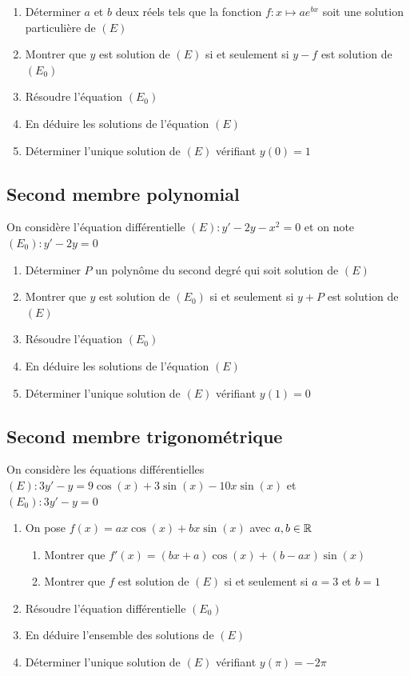 \documentclass[oneside,12pt]{book}          %
\begin{document}
\begin{enumerate}
    \item Déterminer $a$ et $b$ deux réels tels que la fonction $f:x\mapsto ae^{bx}$ soit une solution particulière de $(E)$
    \item Montrer que $y$ est solution de $(E)$ si et seulement si $y-f$ est solution de $(E_0)$
    \item Résoudre l'équation $(E_0)$
    \item En déduire les solutions de l'équation $(E)$
    \item Déterminer l'unique solution de $(E)$ vérifiant $y(0)=1$
\end{enumerate}



\subsection{Second membre polynomial}
  On considère l'équation différentielle $(E):y'-2y-x^2=0$ et on note $(E_0):y'-2y=0$

\begin{enumerate}
    \item Déterminer $P$ un polynôme du second degré qui soit solution de $(E)$
    \item Montrer que $y$ est solution de $(E_0)$ si et seulement si $y+P$ est solution de $(E)$
    \item Résoudre l'équation $(E_0)$
    \item En déduire les solutions de l'équation $(E)$
    \item Déterminer l'unique solution de $(E)$ vérifiant $y(1)=0$
\end{enumerate}



\subsection{Second membre trigonométrique}
On considère les équations différentielles $(E):3y'-y=9\cos(x)+3\sin(x)-10x\sin(x)$ et\\
$(E_0):3y'-y=0$
\begin{enumerate}
    \item On pose $f(x)=ax\cos(x)+bx\sin(x)$ \quad avec $a,b\in{\mathbb R}$
    \begin{enumerate}
        \item Montrer que $f'(x)=(bx+a)\cos(x)+(b-ax)\sin(x)$
        \item Montrer que $f$ est solution de $(E)$ si et seulement si $a=3$ et $b=1$
    \end{enumerate}
    \item Résoudre l'équation différentielle $(E_0)$
    \item En déduire l'ensemble des solutions de $(E)$
    \item Déterminer l'unique solution de $(E)$ vérifiant $y(\pi)=-2\pi$
\end{enumerate}
\end{document}
